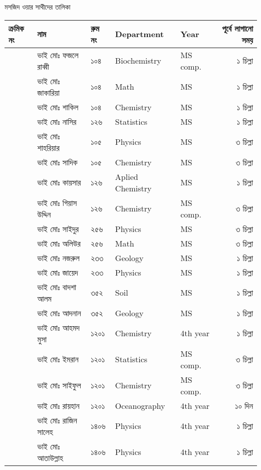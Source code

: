 \documentclass{article}
\newcounter{magicrownumbers}
\newcommand\rownumber{\stepcounter{magicrownumbers}\arabic{magicrownumbers}}
\begin{document}
\large
\begin{center}
মসজিদ ওয়ার সাথীদের তালিকা
\end{center}
\noindent
\centering
\noindent
  \begin{tabular}{@{}lll
>{\selectlanguage{english}}l
>{\selectlanguage{english}}l
    r@{}}
\toprule
ক্রমিক নং &  নাম &  রুম নং &  Department & Year & পূর্বে লাগানো সময়\\
\toprule
\rownumber & ভাই মোঃ ফজলে রাব্বী  & ১০৪ & Biochemistry & MS comp. & ১ চিল্লা\\ 
\rownumber & ভাই মোঃ জাকারিয়া & ১০৪ & Math & MS & ১ চিল্লা\\
\rownumber & ভাই মোঃ শাকিল & ১০৪ & Chemistry & MS & ১ চিল্লা\\
\rownumber & ভাই মোঃ নাসির & ১২৬ & Statistics & MS & ১ চিল্লা\\
\rownumber & ভাই মোঃ শাহরিয়ার & ১০৫ & Physics & MS & ৩ চিল্লা\\
\rownumber & ভাই মোঃ সাদিক & ১০৫ & Chemistry & MS & ৩ চিল্লা\\
\rownumber & ভাই মোঃ কায়সার & ১২৬ & Aplied Chemistry & MS & ১ চিল্লা\\ 
\rownumber & ভাই মোঃ গিয়াস উদ্দিন  & ১২৬ & Chemistry & MS comp. & ৩ চিল্লা\\ 
\rownumber & ভাই মোঃ সাইদুর & ২৫৬ & Physics & MS & ৩ চিল্লা\\ 
\rownumber & ভাই মোঃ অলিউর & ২৫৬ & Math & MS & ৩ চিল্লা\\ 
\rownumber & ভাই মোঃ নজরুল  & ২৩৩ & Geology & MS & ১ চিল্লা\\ 
\rownumber & ভাই মোঃ জায়েদ & ২৩৩ & Physics & MS & ১ চিল্লা\\ 
\rownumber & ভাই মোঃ বাদশা আলম & ৩৫২ & Soil & MS & ১ চিল্লা\\
\rownumber & ভাই মোঃ আদনান & ৩৫২ & Geology & MS & ১ চিল্লা\\
\rownumber & ভাই মোঃ আহমদ মুসা & ১২০১ & Chemistry & 4th year & ১ চিল্লা\\ 
\rownumber & ভাই মোঃ ইমরান & ১২০১ & Statistics & MS comp. & ৩ চিল্লা\\ 
\rownumber & ভাই মোঃ সাইফুল & ১২০১ & Chemistry & MS comp. & ৩ চিল্লা\\ 
\rownumber & ভাই মোঃ রায়হান  & ১২০১ & Oceanography & 4th year & ১০ দিন\\
\rownumber & ভাই মোঃ রাজিন সালেহ & ১৪০৬ & Physics & 4th year & ১ চিল্লা\\ 
\rownumber & ভাই মোঃ আতাউল্লাহ & ১৪০৬ & Physics & 4th year & ১ চিল্লা\\  

\end{tabular}
\end{document}

